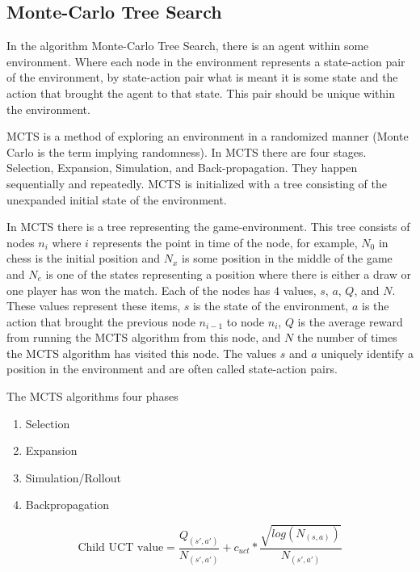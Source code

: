 \subsection{Monte-Carlo Tree Search}

\label{sec:mcts}

In the algorithm Monte-Carlo Tree Search, there is an agent within some environment. Where each node in the environment represents a state-action pair of the environment, by state-action pair what is meant it is some state and the action that brought the agent to that state. This pair should be unique within the environment.

MCTS is a method of exploring an environment in a randomized manner (Monte Carlo is the term implying randomness). In MCTS there are four stages. Selection, Expansion, Simulation, and Back-propagation. They happen sequentially and repeatedly. MCTS is initialized with a tree consisting of the unexpanded initial state of the environment.

In MCTS there is a tree representing the game-environment. This tree consists of nodes $n_i$ where $i$ represents the point in time of the node, for example, $N_0$ in chess is the initial position and $N_x$ is some position in the middle of the game and $N_e$ is one of the states representing a position where there is either a draw or one player has won the match. Each of the nodes has $4$ values, $s$, $a$, $Q$, and $N$. These values represent these items, $s$ is the state of the environment, $a$ is the action that brought the previous node $n_{i-1}$ to node $n_i$, $Q$ is the average reward from running the MCTS algorithm from this node, and $N$ the number of times the MCTS algorithm has visited this node. The values $s$ and $a$ uniquely identify a position in the environment and are often called state-action pairs.

The MCTS algorithms four phases
\begin{enumerate}
  \item Selection
  \item Expansion
  \item Simulation/Rollout
  \item Backpropagation
\end{enumerate}


\begin{equation} \label{UCT_formula}
  \text{Child UCT value} = \frac{Q_{(s',a')}}{N_{(s',a')}} + c_{uct} * \frac{\sqrt{log(N_{(s,a)})}}{N_{(s',a')}}
\end{equation}

